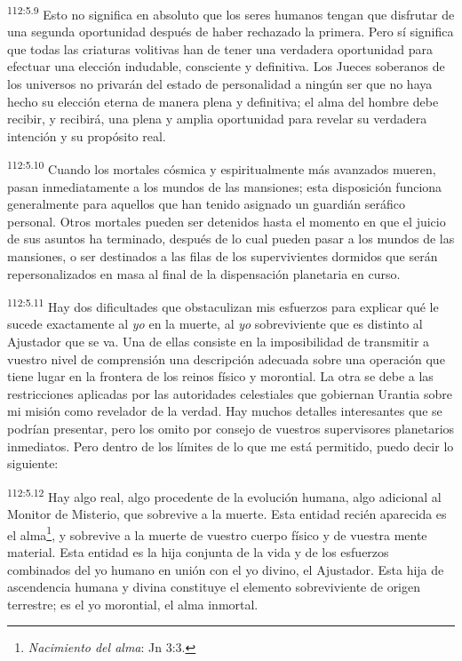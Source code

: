 \par
\textsuperscript{112:5.9} Esto no significa en absoluto que los seres humanos tengan que disfrutar de una segunda oportunidad después de haber rechazado la primera. Pero sí significa que todas las criaturas volitivas han de tener una verdadera oportunidad para efectuar una elección indudable, consciente y definitiva. Los Jueces soberanos de los universos no privarán del estado de personalidad a ningún ser que no haya hecho su elección eterna de manera plena y definitiva; el alma del hombre debe recibir, y recibirá, una plena y amplia oportunidad para revelar su verdadera intención y su propósito real.

\par
\textsuperscript{112:5.10} Cuando los mortales cósmica y espiritualmente más avanzados mueren, pasan inmediatamente a los mundos de las mansiones; esta disposición funciona generalmente para aquellos que han tenido asignado un guardián seráfico personal. Otros mortales pueden ser detenidos hasta el momento en que el juicio de sus asuntos ha terminado, después de lo cual pueden pasar a los mundos de las mansiones, o ser destinados a las filas de los supervivientes dormidos que serán repersonalizados en masa al final de la dispensación planetaria en curso.

\par
\textsuperscript{112:5.11} Hay dos dificultades que obstaculizan mis esfuerzos para explicar qué le sucede exactamente al \textit{yo} en la muerte, al \textit{yo} sobreviviente que es distinto al Ajustador que se va. Una de ellas consiste en la imposibilidad de transmitir a vuestro nivel de comprensión una descripción adecuada sobre una operación que tiene lugar en la frontera de los reinos físico y morontial. La otra se debe a las restricciones aplicadas por las autoridades celestiales que gobiernan Urantia sobre mi misión como revelador de la verdad. Hay muchos detalles interesantes que se podrían presentar, pero los omito por consejo de vuestros supervisores planetarios inmediatos. Pero dentro de los límites de lo que me está permitido, puedo decir lo siguiente:

\par
\textsuperscript{112:5.12} Hay algo real, algo procedente de la evolución humana, algo adicional al Monitor de Misterio, que sobrevive a la muerte. Esta entidad recién aparecida es el alma\footnote{\textit{Nacimiento del alma}: Jn 3:3.}, y sobrevive a la muerte de vuestro cuerpo físico y de vuestra mente material. Esta entidad es la hija conjunta de la vida y de los esfuerzos combinados del yo humano en unión con el yo divino, el Ajustador. Esta hija de ascendencia humana y divina constituye el elemento sobreviviente de origen terrestre; es el yo morontial, el alma inmortal.


